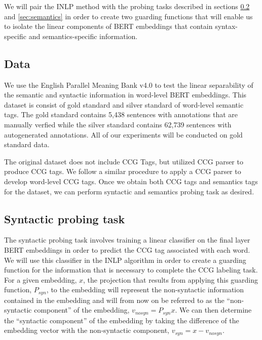 \documentclass[11pt,a4paper]{article}
\begin{document}
We will pair the INLP method with the probing tasks described in sections \ref{sec:syntactic} and \ref{sec:semantics} in order to create two guarding functions that will enable us to isolate the linear components of BERT embeddings that contain syntax-specific and semantics-specific information. 


\subsection{Data}
\label{sec:data}

We use the English Parallel Meaning Bank v4.0 \citep{pmbData} to test the linear separability of the semantic and syntactic information in word-level BERT embeddings. This dataset is consist of gold standard and silver standard of word-level semantic tags. The gold standard contains 5,438 sentences with annotations that are manually verfied while the silver standard contains 62,739 sentences with autogenerated annotations. All of our experiments will be conducted on gold standard data. 

The original dataset does not include CCG Tags, but \citealp{pmbData} utilized CCG parser to produce CCG tags. We follow a similar procedure to apply a CCG parser \citep{ccg_tagger} to develop word-level CCG tags. Once we obtain both CCG tags and semantics tags for the dataset, we can perform syntactic and semantics probing task as desired.%


\subsection{Syntactic probing task}
\label{sec:syntactic}

The syntactic probing task involves training a linear classifier on the final layer BERT embeddings in order to predict the CCG tag associated with each word. We will use this classifier in the INLP algorithm in order to create a guarding function for the information that is necessary to complete the CCG labeling task. For a given embedding, $x$, the projection that results from applying this guarding function, $P_{syn}$, to the embedding will represent the non-syntactic information contained in the embedding and will from now on be referred to as the ``non-syntactic component'' of the embedding, $v_{no syn} = P_{syn} x$. We can then determine the ``syntactic component'' of the embedding by taking the difference of the embedding vector with the non-syntactic component, $v_{syn} = x - v_{no syn}$.
\end{document}
